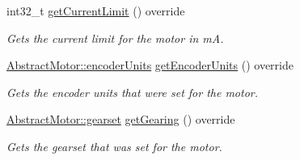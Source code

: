 \begin{DoxyCompactItemize}
int32\+\_\+t \mbox{\hyperlink{classokapi_1_1MockMotor_a5535db4fba5f8c0ce5c20607f0586272}{get\+Current\+Limit}} () override
\begin{DoxyCompactList}\small\item\em Gets the current limit for the motor in mA. \end{DoxyCompactList}\item 
\mbox{\hyperlink{classokapi_1_1AbstractMotor_ae811cd825099f2defadeb1b7f7e7764c}{Abstract\+Motor\+::encoder\+Units}} \mbox{\hyperlink{classokapi_1_1MockMotor_a4cbe026162527d49d3ce6715a63880f5}{get\+Encoder\+Units}} () override
\begin{DoxyCompactList}\small\item\em Gets the encoder units that were set for the motor. \end{DoxyCompactList}\item 
\mbox{\hyperlink{classokapi_1_1AbstractMotor_a88aaa6ea2fa10f5520a537bbf26774d5}{Abstract\+Motor\+::gearset}} \mbox{\hyperlink{classokapi_1_1MockMotor_aa4ba179d8b028075dce41a08a258339f}{get\+Gearing}} () override
\begin{DoxyCompactList}\small\item\em Gets the gearset that was set for the motor. \end{DoxyCompactList}\end{DoxyCompactItemize}
